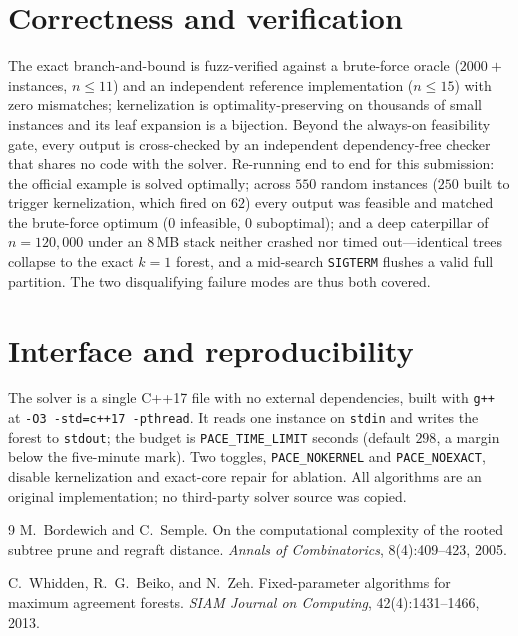 \documentclass[a4paper,UStitle,numberwithinsect=false,autoref]{lipics-v2021}
\begin{document}
\section{Correctness and verification}

The exact branch-and-bound is fuzz-verified against a brute-force oracle ($2000{+}$
instances, $n\le 11$) and an independent reference implementation ($n\le 15$) with zero
mismatches; kernelization is optimality-preserving on thousands of small instances and
its leaf expansion is a bijection. Beyond the always-on feasibility gate, every output
is cross-checked by an independent dependency-free checker that shares no code with the
solver. Re-running end to end for this submission: the official example is solved
optimally; across $550$ random instances ($250$ built to trigger kernelization, which
fired on $62$) every output was feasible and matched the brute-force optimum ($0$
infeasible, $0$ suboptimal); and a deep caterpillar of $n{=}120{,}000$ under an
$8$\,MB stack neither crashed nor timed out---identical trees collapse to the exact
$k{=}1$ forest, and a mid-search \texttt{SIGTERM} flushes a valid full partition. The
two disqualifying failure modes are thus both covered.

\section{Interface and reproducibility}

The solver is a single C++17 file with no external dependencies, built with
\texttt{g++} at \texttt{-O3 -std=c++17 -pthread}. It reads one instance on
\texttt{stdin} and writes the forest to \texttt{stdout}; the budget is
\texttt{PACE\_TIME\_LIMIT} seconds (default $298$, a margin below the five-minute
mark). Two toggles, \texttt{PACE\_NOKERNEL} and \texttt{PACE\_NOEXACT}, disable
kernelization and exact-core repair for ablation. All algorithms are an original
implementation; no third-party solver source was copied.

\begin{thebibliography}{9}
M.~Bordewich and C.~Semple.
\newblock On the computational complexity of the rooted subtree prune and regraft
distance.
\newblock \emph{Annals of Combinatorics}, 8(4):409--423, 2005.

C.~Whidden, R.~G.~Beiko, and N.~Zeh.
\newblock Fixed-parameter algorithms for maximum agreement forests.
\newblock \emph{SIAM Journal on Computing}, 42(4):1431--1466, 2013.
\end{thebibliography}
\end{document}
